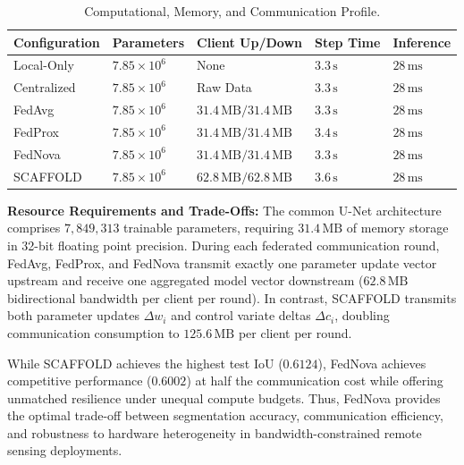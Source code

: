 \documentclass[conference]{IEEEtran}
\begin{document}
\begin{table}[h]
\centering
\caption{Computational, Memory, and Communication Profile.}
\label{tab:compute}
\small
\begin{tabularx}{\columnwidth}{lYYYY}
\toprule
\textbf{Configuration} & \textbf{Parameters} & \textbf{Client Up/Down} & \textbf{Step Time} & \textbf{Inference} \\
\midrule
Local-Only & $7.85\times 10^6$ & None & $3.3\,\text{s}$ & $28\,\text{ms}$ \\
Centralized & $7.85\times 10^6$ & Raw Data & $3.3\,\text{s}$ & $28\,\text{ms}$ \\
FedAvg & $7.85\times 10^6$ & $31.4\,\text{MB} / 31.4\,\text{MB}$ & $3.3\,\text{s}$ & $28\,\text{ms}$ \\
FedProx & $7.85\times 10^6$ & $31.4\,\text{MB} / 31.4\,\text{MB}$ & $3.4\,\text{s}$ & $28\,\text{ms}$ \\
FedNova & $7.85\times 10^6$ & $31.4\,\text{MB} / 31.4\,\text{MB}$ & $3.3\,\text{s}$ & $28\,\text{ms}$ \\
SCAFFOLD & $7.85\times 10^6$ & $62.8\,\text{MB} / 62.8\,\text{MB}$ & $3.6\,\text{s}$ & $28\,\text{ms}$ \\
\bottomrule
\end{tabularx}
\end{table}

\textbf{Resource Requirements and Trade-Offs:} The common U-Net architecture comprises $7,849,313$ trainable parameters, requiring $31.4\,\text{MB}$ of memory storage in 32-bit floating point precision. During each federated communication round, FedAvg, FedProx, and FedNova transmit exactly one parameter update vector upstream and receive one aggregated model vector downstream ($62.8\,\text{MB}$ bidirectional bandwidth per client per round). In contrast, SCAFFOLD transmits both parameter updates $\Delta w_i$ and control variate deltas $\Delta c_i$, doubling communication consumption to $125.6\,\text{MB}$ per client per round. 

While SCAFFOLD achieves the highest test IoU ($0.6124$), FedNova achieves competitive performance ($0.6002$) at half the communication cost while offering unmatched resilience under unequal compute budgets. Thus, FedNova provides the optimal trade-off between segmentation accuracy, communication efficiency, and robustness to hardware heterogeneity in bandwidth-constrained remote sensing deployments.
\end{document}
